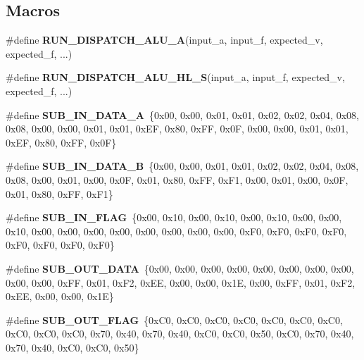 \subsection*{Macros}
\begin{DoxyCompactItemize}
\item 
\#define {\bfseries R\+U\+N\+\_\+\+D\+I\+S\+P\+A\+T\+C\+H\+\_\+\+A\+L\+U\+\_\+A}(input\+\_\+a,  input\+\_\+f,  expected\+\_\+v,  expected\+\_\+f, ...)
\item 
\#define {\bfseries R\+U\+N\+\_\+\+D\+I\+S\+P\+A\+T\+C\+H\+\_\+\+A\+L\+U\+\_\+\+H\+L\+\_\+S}(input\+\_\+a,  input\+\_\+f,  expected\+\_\+v,  expected\+\_\+f, ...)
\item 
\mbox{\label{unit-test-cpu-dispatch_8c_ad224c11f2b4405e798e012f2e216f6c4}} 
\#define {\bfseries S\+U\+B\+\_\+\+I\+N\+\_\+\+D\+A\+T\+A\+\_\+A}~\{0x00, 0x00, 0x01, 0x01, 0x02, 0x02, 0x04, 0x08, 0x08, 0x00, 0x00, 0x01, 0x01, 0x\+E\+F, 0x80, 0x\+F\+F, 0x0\+F, 0x00, 0x00, 0x01, 0x01, 0x\+E\+F, 0x80, 0x\+F\+F, 0x0\+F\}
\item 
\mbox{\label{unit-test-cpu-dispatch_8c_a97a58d9be7b1f799ce7241b5c72bafbf}} 
\#define {\bfseries S\+U\+B\+\_\+\+I\+N\+\_\+\+D\+A\+T\+A\+\_\+B}~\{0x00, 0x00, 0x01, 0x01, 0x02, 0x02, 0x04, 0x08, 0x08, 0x00, 0x01, 0x00, 0x0\+F, 0x01, 0x80, 0x\+F\+F, 0x\+F1, 0x00, 0x01, 0x00, 0x0\+F, 0x01, 0x80, 0x\+F\+F, 0x\+F1\}
\item 
\mbox{\label{unit-test-cpu-dispatch_8c_aed6c5bf5bf00496207486e3914ac0cec}} 
\#define {\bfseries S\+U\+B\+\_\+\+I\+N\+\_\+\+F\+L\+AG}~\{0x00, 0x10, 0x00, 0x10, 0x00, 0x10, 0x00, 0x00, 0x10, 0x00, 0x00, 0x00, 0x00, 0x00, 0x00, 0x00, 0x00, 0x\+F0, 0x\+F0, 0x\+F0, 0x\+F0, 0x\+F0, 0x\+F0, 0x\+F0, 0x\+F0\}
\item 
\mbox{\label{unit-test-cpu-dispatch_8c_a83788455f68eac79f9fbb48100031c55}} 
\#define {\bfseries S\+U\+B\+\_\+\+O\+U\+T\+\_\+\+D\+A\+TA}~\{0x00, 0x00, 0x00, 0x00, 0x00, 0x00, 0x00, 0x00, 0x00, 0x00, 0x\+F\+F, 0x01, 0x\+F2, 0x\+E\+E, 0x00, 0x00, 0x1\+E, 0x00, 0x\+F\+F, 0x01, 0x\+F2, 0x\+E\+E, 0x00, 0x00, 0x1\+E\}
\item 
\mbox{\label{unit-test-cpu-dispatch_8c_a241e08d55cc7ade6859c9cd9293e4a45}} 
\#define {\bfseries S\+U\+B\+\_\+\+O\+U\+T\+\_\+\+F\+L\+AG}~\{0x\+C0, 0x\+C0, 0x\+C0, 0x\+C0, 0x\+C0, 0x\+C0, 0x\+C0, 0x\+C0, 0x\+C0, 0x\+C0, 0x70, 0x40, 0x70, 0x40, 0x\+C0, 0x\+C0, 0x50, 0x\+C0, 0x70, 0x40, 0x70, 0x40, 0x\+C0, 0x\+C0, 0x50\}

\end{DoxyCompactItemize}
